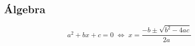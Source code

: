\subsection*{Álgebra}

\begin{equation*}
    a^2 + bx + c = 0 \; \Longleftrightarrow \; x = \frac{-b \pm \sqrt{b^2 - 4ac}}{2a}
\end{equation*}